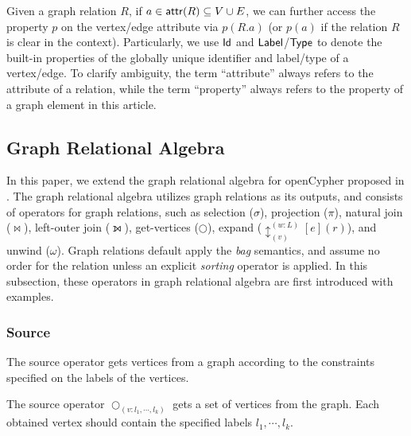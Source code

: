 Given a graph relation $R$, if $a \in {\ensuremath {\mathsf{attr}}}(R) \subseteq V \cup E$, we can further access the property $p$ on the vertex/edge attribute via $p(R.a)$ (or $p(a)$ if the relation $R$ is clear in the context). 
Particularly, we use ${\mathsf{Id}}$ and ${\mathsf{Label}}$/${\mathsf{Type}}$ to denote the built-in properties of the globally unique identifier and label/type of a vertex/edge. 
To clarify ambiguity, the term ``attribute'' always refers to the attribute of a relation, while the term ``property'' always refers to the property of a graph element in this article.


\subsection{Graph Relational Algebra}
\label{sec:graph-relational-algebra}

In this paper, we extend the graph relational algebra for openCypher proposed in \cite{graph-relational-algebra}.
The graph relational algebra utilizes graph relations as its outputs, and consists of operators for graph relations, such as selection ($\sigma$), projection ($\pi$), natural join ($\Join$), left-outer join ($\leftouterjoin$), get-vertices ($\bigcirc$), expand ($\updownarrow^{(w:L)}_{(v)}[e](r)$), and unwind ($\omega$).
Graph relations default apply the \emph{bag} semantics, and assume no order for the relation unless an explicit \emph{sorting} operator is applied.
In this subsection, these operators in graph relational algebra are first introduced with examples.


\subsubsection{Source}
The source operator gets vertices from a graph according to the constraints specified on the labels of the vertices.

\begin{definition}
    The source operator $\bigcirc_{(v:l_1, \cdots, l_k)}$ gets a set of vertices from the graph.
    Each obtained vertex should contain the specified labels $l_1, \cdots, l_k$.
\end{definition}

